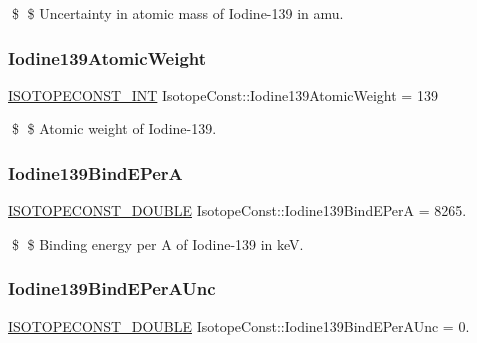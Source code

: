 \$ \$ Uncertainty in atomic mass of Iodine-\/139 in amu. \mbox{\label{group___isotope_const-_iodine-_i139_ga8aaa851f9af62b34d1080c1690e44b08}} 
\subsubsection{\texorpdfstring{Iodine139\+Atomic\+Weight}{Iodine139AtomicWeight}}
{\footnotesize\ttfamily \mbox{\hyperlink{group___isotope_const-_macros_ga5f18360b3e99483a35c32d789e62621c}{I\+S\+O\+T\+O\+P\+E\+C\+O\+N\+S\+T\+\_\+\+I\+NT}} Isotope\+Const\+::\+Iodine139\+Atomic\+Weight = 139}

\$ \$ Atomic weight of Iodine-\/139. \mbox{\label{group___isotope_const-_iodine-_i139_gaf4a6e9deb2e840b4d2ecbc7c0bfa1bb7}} 
\subsubsection{\texorpdfstring{Iodine139\+Bind\+E\+PerA}{Iodine139BindEPerA}}
{\footnotesize\ttfamily \mbox{\hyperlink{group___isotope_const-_macros_ga8f45a7272ce02c0b4c65c44636ed719a}{I\+S\+O\+T\+O\+P\+E\+C\+O\+N\+S\+T\+\_\+\+D\+O\+U\+B\+LE}} Isotope\+Const\+::\+Iodine139\+Bind\+E\+PerA = 8265.}

\$ \$ Binding energy per A of Iodine-\/139 in keV. \mbox{\label{group___isotope_const-_iodine-_i139_ga7ed08d4eef104c9a90e21975607629dd}} 
\subsubsection{\texorpdfstring{Iodine139\+Bind\+E\+Per\+A\+Unc}{Iodine139BindEPerAUnc}}
{\footnotesize\ttfamily \mbox{\hyperlink{group___isotope_const-_macros_ga8f45a7272ce02c0b4c65c44636ed719a}{I\+S\+O\+T\+O\+P\+E\+C\+O\+N\+S\+T\+\_\+\+D\+O\+U\+B\+LE}} Isotope\+Const\+::\+Iodine139\+Bind\+E\+Per\+A\+Unc = 0.}

